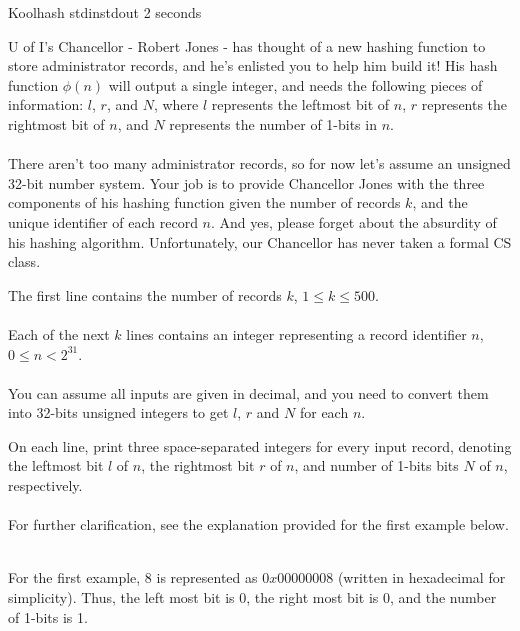 \begin{problem}{Koolhash}
{stdin}{stdout}
{2 seconds}{}{}

U of I's Chancellor - Robert Jones - has thought of a new hashing function to store administrator records, and he's enlisted you to help him build it! His hash function $\phi(n)$ will output a single integer, and needs the following pieces of information: $l$, $r$, and $N$, where $l$ represents the leftmost bit of  $n$, $r$ represents the rightmost bit of $n$, and $N$ represents the number of 1-bits in $n$. \\ \\
There aren't too many administrator records, so for now let's assume an unsigned 32-bit number system. Your job is to provide Chancellor Jones with the three components of his hashing function given the number of records $k$, and the unique identifier of each record $n$. And yes, please forget about the absurdity of his hashing algorithm. Unfortunately, our Chancellor has never taken a formal CS class.

\InputFile
The first line contains the number of records $k$, $1 \leq k \leq 500$. \\ \\
Each of the next $k$ lines contains an integer representing a record identifier $n$, $0 \leq n < 2^{31}$.\\ \\
You can assume all inputs are given in decimal, and you need to convert them into 32-bits unsigned integers to get $l$, $r$ and $N$ for each $n$.

\OutputFile
On each line, print three space-separated integers for every input record, denoting the leftmost bit $l$ of $n$, the rightmost bit $r$ of $n$, and number of 1-bits bits $N$ of $n$, respectively. \\ \\

For further clarification, see the explanation provided for the first example below.
\Examples

\begin{example}
%
\end{example}

\begin{example}
%
\end{example} \\
\Explanation
For the first example, $8$ is represented as $0x00000008$ (written in hexadecimal for simplicity). Thus, the left most bit is 0, the right most bit is 0, and the number of 1-bits is 1.
\end{problem}
